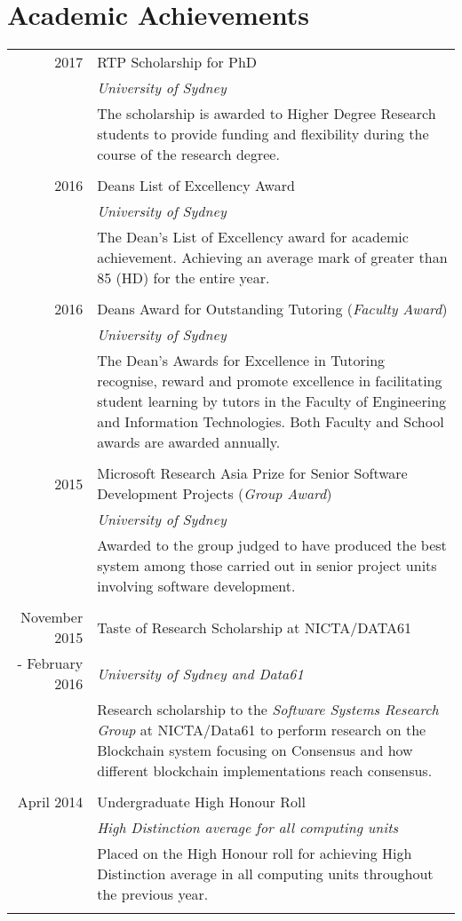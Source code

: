 \documentclass[10pt]{article}
\begin{document}
\section{Academic Achievements}
\begin{tabular}{r p{11cm}}
    2017 & RTP Scholarship for PhD \\ & \emph{University of Sydney} \\ & \footnotesize{The scholarship is awarded to Higher Degree Research students to provide funding and flexibility during the course of the research degree.}\\\multicolumn{2}{c}{}\\

	2016 & Deans List of Excellency Award \\ & \emph{University of Sydney} \\ & \footnotesize{The Dean's List of Excellency award for academic achievement. Achieving an average mark of greater than 85 (HD) for the entire year.}\\\multicolumn{2}{c}{}\\

2016 & Deans Award for Outstanding Tutoring (\emph{Faculty Award}) \\ & \emph{University of Sydney} \\ & \footnotesize{The Dean's Awards for Excellence in Tutoring recognise, reward and promote excellence in facilitating student learning by tutors in the Faculty of Engineering and Information Technologies. Both Faculty and School awards are awarded annually.}\\\multicolumn{2}{c}{}\\

2015 & Microsoft Research Asia Prize for Senior Software Development Projects (\emph{Group Award}) \\  & \emph{University of Sydney}\\ & \footnotesize{Awarded to the group judged to have produced the best system among those carried out in senior project units involving software development.}\\\multicolumn{2}{c}{}\\

November 2015 &Taste of Research Scholarship at \textsc{NICTA/DATA61} \\ - February 2016 & \emph{University of Sydney and Data61}\\&\footnotesize{Research scholarship to the \emph{Software Systems Research Group} at NICTA/Data61 to perform research on the Blockchain system focusing on Consensus and how different blockchain implementations reach consensus.}\\\multicolumn{2}{c}{} \\

April 2014 & Undergraduate High Honour Roll \\ & \emph{High Distinction average for all computing units}\\&\footnotesize{Placed on the High Honour roll for achieving High Distinction average in all computing units throughout the previous year.}\\\multicolumn{2}{c}{} \\
\end{tabular}
\end{document}
